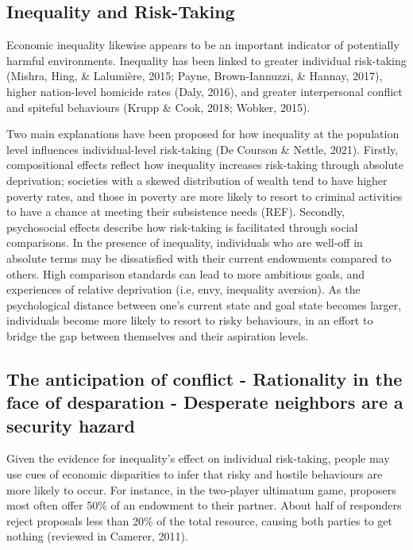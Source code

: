 \documentclass[
  english,
  man]{apa6}
\begin{document}
\hypertarget{inequality-and-risk-taking}{%
\subsection{Inequality and Risk-Taking}\label{inequality-and-risk-taking}}

Economic inequality likewise appears to be an important indicator of potentially harmful environments. Inequality has been linked to greater individual risk-taking (Mishra, Hing, \& Lalumière, 2015; Payne, Brown-Iannuzzi, \& Hannay, 2017), higher nation-level homicide rates (Daly, 2016), and greater interpersonal conflict and spiteful behaviours (Krupp \& Cook, 2018; Wobker, 2015).

Two main explanations have been proposed for how inequality at the population level influences individual-level risk-taking (De Courson \& Nettle, 2021). Firstly, compositional effects reflect how inequality increases risk-taking through absolute deprivation; societies with a skewed distribution of wealth tend to have higher poverty rates, and those in poverty are more likely to resort to criminal activities to have a chance at meeting their subsistence needs (REF). Secondly, psychosocial effects describe how risk-taking is facilitated through social comparisons. In the presence of inequality, individuals who are well-off in absolute terms may be dissatisfied with their current endowments compared to others. High comparison standards can lead to more ambitious goals, and experiences of relative deprivation (i.e, envy, inequality aversion). As the psychological distance between one's current state and goal state becomes larger, individuals become more likely to resort to risky behaviours, in an effort to bridge the gap between themselves and their aspiration levels.

\hypertarget{the-anticipation-of-conflict---rationality-in-the-face-of-desparation---desperate-neighbors-are-a-security-hazard}{%
\subsection{\texorpdfstring{The anticipation of conflict - Rationality in the face of desparation - \textbf{Desperate neighbors are a security hazard}}{The anticipation of conflict - Rationality in the face of desparation - Desperate neighbors are a security hazard}}\label{the-anticipation-of-conflict---rationality-in-the-face-of-desparation---desperate-neighbors-are-a-security-hazard}}

Given the evidence for inequality's effect on individual risk-taking, people may use cues of economic disparities to infer that risky and hostile behaviours are more likely to occur. For instance, in the two-player ultimatum game, proposers most often offer 50\% of an endowment to their partner. About half of responders reject proposals less than 20\% of the total resource, causing both parties to get nothing (reviewed in Camerer, 2011).
\end{document}
